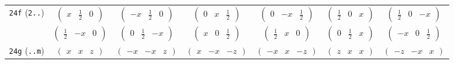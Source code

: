 \documentclass[fleqn,9pt,landscape]{jsarticle}
\begin{document}
\begin{center}
\begin{longtable}{ccccccc}
{\tt 24f} ({\tt 2..}) & $ \begin{pmatrix} x & \frac{1}{2} & 0 \end{pmatrix} $ & $ \begin{pmatrix} - x & \frac{1}{2} & 0 \end{pmatrix} $ & $ \begin{pmatrix} 0 & x & \frac{1}{2} \end{pmatrix} $ & $ \begin{pmatrix} 0 & - x & \frac{1}{2} \end{pmatrix} $ & $ \begin{pmatrix} \frac{1}{2} & 0 & x \end{pmatrix} $ & $ \begin{pmatrix} \frac{1}{2} & 0 & - x \end{pmatrix} $ \\
& $ \begin{pmatrix} \frac{1}{2} & - x & 0 \end{pmatrix} $ & $ \begin{pmatrix} 0 & \frac{1}{2} & - x \end{pmatrix} $ & $ \begin{pmatrix} x & 0 & \frac{1}{2} \end{pmatrix} $ & $ \begin{pmatrix} \frac{1}{2} & x & 0 \end{pmatrix} $ & $ \begin{pmatrix} 0 & \frac{1}{2} & x \end{pmatrix} $ & $ \begin{pmatrix} - x & 0 & \frac{1}{2} \end{pmatrix} $ \\ \hline
{\tt 24g} ({\tt ..m}) & $ \begin{pmatrix} x & x & z \end{pmatrix} $ & $ \begin{pmatrix} - x & - x & z \end{pmatrix} $ & $ \begin{pmatrix} x & - x & - z \end{pmatrix} $ & $ \begin{pmatrix} - x & x & - z \end{pmatrix} $ & $ \begin{pmatrix} z & x & x \end{pmatrix} $ & $ \begin{pmatrix} - z & - x & x \end{pmatrix} $ \\

\end{longtable}
\end{center}
\end{document}
